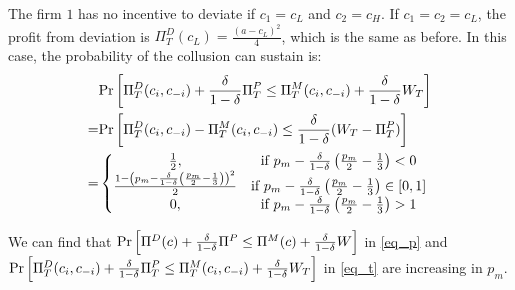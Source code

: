 \documentclass[12pt]{article}
\begin{document}
The firm $1$ has no incentive to deviate if $c_1=c_L$ and $c_2=c_H$. If $c_1=c_2=c_L$, the profit from deviation is $\Pi^D_T(c_L)=\frac{(a-c_L)^2}{4}$, which is the same as before. In this case, the probability of the collusion can sustain is:
\begin{equation}
    \begin{aligned}
        &\textnormal{Pr}\left[\Pi^D_T(c_i,c_{-i})+\frac{\delta}{1-\delta}\Pi^P_T\leq \Pi^M_T(c_i,c_{-i})+\frac{\delta}{1-\delta}W_T\right]\\
        =&\textnormal{Pr}\left[\Pi^D_T(c_i,c_{-i})-\Pi^M_T(c_i,c_{-i})\leq \frac{\delta}{1-\delta}(W_T-\Pi^P_T)\right]\\
        =&\left\{\begin{matrix}
            \frac{1}{2},&\text{if }p_m-\frac{\delta}{1-\delta}\left(\frac{p_m}{2}-\frac{1}{3}\right)<0\\
            \frac{1-\left(p_m-\frac{\delta}{1-\delta}\left(\frac{p_m}{2}-\frac{1}{3}\right)\right)^2}{2}&\text{if }p_m-\frac{\delta}{1-\delta}\left(\frac{p_m}{2}-\frac{1}{3}\right)\in[0,1]\\
            0,&\text{if }p_m-\frac{\delta}{1-\delta}\left(\frac{p_m}{2}-\frac{1}{3}\right)>1
        \end{matrix}\right.
    \end{aligned}
    \label{eq_t}
\end{equation}

We can find that $\textnormal{Pr}\left[\Pi^D(c)+\frac{\delta}{1-\delta}\Pi^P\leq \Pi^M(c)+\frac{\delta}{1-\delta}W\right]$ in \eqref{eq_p} and $\textnormal{Pr}\left[\Pi^D_T(c_i,c_{-i})+\frac{\delta}{1-\delta}\Pi^P_T\leq \Pi^M_T(c_i,c_{-i})+\frac{\delta}{1-\delta}W_T\right]$ in \eqref{eq_t} are increasing in $p_m$.
\end{document}
